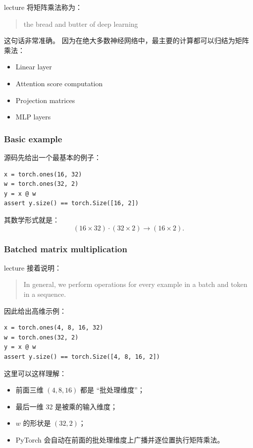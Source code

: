 \documentclass[a4paper,UTF8]{article}
\numberwithin{equation}{section}
\begin{document}
lecture 将矩阵乘法称为：
\begin{quote}
the bread and butter of deep learning
\end{quote}

这句话非常准确。  
因为在绝大多数神经网络中，最主要的计算都可以归结为矩阵乘法：
\begin{itemize}
    \item Linear layer
    \item Attention score computation
    \item Projection matrices
    \item MLP layers
\end{itemize}

\subsubsection{Basic example}

源码先给出一个最基本的例子：
\begin{verbatim}
x = torch.ones(16, 32)
w = torch.ones(32, 2)
y = x @ w
assert y.size() == torch.Size([16, 2])
\end{verbatim}

其数学形式就是：
\[
(16 \times 32) \cdot (32 \times 2) \to (16 \times 2).
\]

\subsubsection{Batched matrix multiplication}

lecture 接着说明：
\begin{quote}
In general, we perform operations for every example in a batch and token in a sequence.
\end{quote}

因此给出高维示例：
\begin{verbatim}
x = torch.ones(4, 8, 16, 32)
w = torch.ones(32, 2)
y = x @ w
assert y.size() == torch.Size([4, 8, 16, 2])
\end{verbatim}

这里可以这样理解：
\begin{itemize}
    \item 前面三维 \((4,8,16)\) 都是 ``批处理维度''；
    \item 最后一维 32 是被乘的输入维度；
    \item \(w\) 的形状是 \((32,2)\)；
    \item PyTorch 会自动在前面的批处理维度上广播并逐位置执行矩阵乘法。
\end{itemize}
\end{document}
